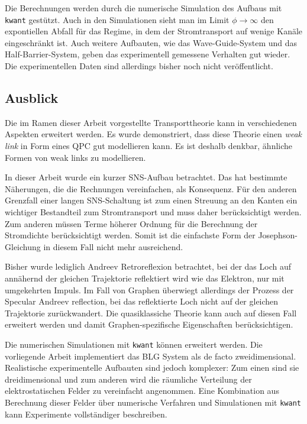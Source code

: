 Die Berechnungen werden durch die numerische Simulation des Aufbaus mit \texttt{kwant} gest\"utzt. Auch in den Simulationen sieht man im Limit $\phi \rightarrow \infty$ den expontiellen Abfall f\"ur das Regime, in dem der Stromtransport auf wenige Kan\"ale eingeschr\"ankt ist. Auch weitere Aufbauten, wie das Wave-Guide-System und das Half-Barrier-System, geben das experimentell gemessene Verhalten gut wieder. Die experimentellen Daten sind allerdings bisher noch nicht ver\"offentlicht.

\subsection*{Ausblick}
Die im Ramen dieser Arbeit vorgestellte Transporttheorie kann in verschiedenen Aspekten erweitert werden. Es wurde demonstriert, dass diese Theorie einen \emph{weak link} in Form eines QPC gut modellieren kann. Es ist deshalb denkbar, \"ahnliche Formen von weak links zu modellieren.

In dieser Arbeit wurde ein kurzer SNS-Aufbau betrachtet. Das hat bestimmte N\"aherungen, die die Rechnungen vereinfachen, als Konsequenz.  F\"ur den anderen Grenzfall einer langen SNS-Schaltung ist zum einen Streuung an den Kanten ein wichtiger Bestandteil zum Stromtransport und muss daher ber\"ucksichtigt werden. Zum anderen m\"ussen Terme h\"oherer Ordnung f\"ur die Berechnung der Stromdichte ber\"ucksichtigt werden. Somit ist die einfachste Form der Josephson-Gleichung in diesem Fall nicht mehr ausreichend. 

Bisher wurde lediglich Andreev Retroreflexion betrachtet, bei der das Loch auf ann\"ahernd der gleichen Trajektorie reflektiert wird wie das Elektron, nur mit umgekehrten Impuls. Im Fall von Graphen \"uberwiegt allerdings der Prozess der Specular Andreev reflection, bei das reflektierte Loch nicht auf der gleichen Trajektorie zur\"uckwandert. Die quasiklassiche Theorie kann auch auf diesen Fall erweitert werden und damit Graphen-spezifische Eigenschaften ber\"ucksichtigen.

Die numerischen Simulationen mit \texttt{kwant} k\"onnen erweitert werden. Die vorliegende Arbeit implementiert das BLG System als de facto zweidimensional. Realistische experimentelle Aufbauten sind jedoch komplexer: Zum einen sind sie dreidimensional und zum anderen wird die r\"aumliche Verteilung der elektrostatischen Felder zu vereinfacht angenommen. Eine Kombination aus Berechnung dieser Felder \"uber numerische Verfahren und Simulationen mit \texttt{kwant} kann Experimente vollst\"andiger beschreiben. 


% 





